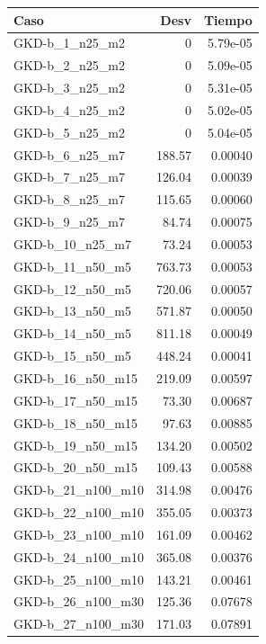 \documentclass{article}
\begin{document}
\begin{table}[ht]
\centering
\footnotesize
\begin{tabular}{|l|r|r|}
\hline
\textbf{Caso} & \textbf{Desv} & \textbf{Tiempo} \\ \hline
GKD-b\_1\_n25\_m2 & 0 & 5.79e-05 \\ \hline
GKD-b\_2\_n25\_m2 & 0 & 5.09e-05 \\ \hline
GKD-b\_3\_n25\_m2 & 0 & 5.31e-05 \\ \hline
GKD-b\_4\_n25\_m2 & 0 & 5.02e-05 \\ \hline
GKD-b\_5\_n25\_m2 & 0 & 5.04e-05 \\ \hline
GKD-b\_6\_n25\_m7 & 188.57 & 0.00040 \\ \hline
GKD-b\_7\_n25\_m7 & 126.04 & 0.00039 \\ \hline
GKD-b\_8\_n25\_m7 & 115.65 & 0.00060 \\ \hline
GKD-b\_9\_n25\_m7 & 84.74 & 0.00075 \\ \hline
GKD-b\_10\_n25\_m7 & 73.24 & 0.00053 \\ \hline
GKD-b\_11\_n50\_m5 & 763.73 & 0.00053 \\ \hline
GKD-b\_12\_n50\_m5 & 720.06 & 0.00057 \\ \hline
GKD-b\_13\_n50\_m5 & 571.87 & 0.00050 \\ \hline
GKD-b\_14\_n50\_m5 & 811.18 & 0.00049 \\ \hline
GKD-b\_15\_n50\_m5 & 448.24 & 0.00041 \\ \hline
GKD-b\_16\_n50\_m15 & 219.09 & 0.00597 \\ \hline
GKD-b\_17\_n50\_m15 & 73.30 & 0.00687 \\ \hline
GKD-b\_18\_n50\_m15 & 97.63 & 0.00885 \\ \hline
GKD-b\_19\_n50\_m15 & 134.20 & 0.00502 \\ \hline
GKD-b\_20\_n50\_m15 & 109.43 & 0.00588 \\ \hline
GKD-b\_21\_n100\_m10 & 314.98 & 0.00476 \\ \hline
GKD-b\_22\_n100\_m10 & 355.05 & 0.00373 \\ \hline
GKD-b\_23\_n100\_m10 & 161.09 & 0.00462 \\ \hline
GKD-b\_24\_n100\_m10 & 365.08 & 0.00376 \\ \hline
GKD-b\_25\_n100\_m10 & 143.21 & 0.00461 \\ \hline
GKD-b\_26\_n100\_m30 & 125.36 & 0.07678 \\ \hline
GKD-b\_27\_n100\_m30 & 171.03 & 0.07891 \\ \hline

\end{tabular}
\end{table}
\end{document}
